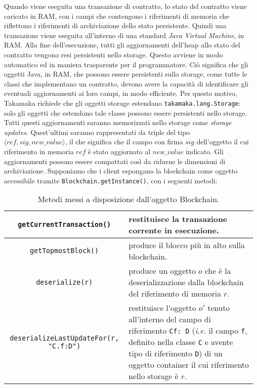 Quando viene eseguita una transazione di contratto, lo stato del contratto viene caricato in RAM, con i campi che contengono i riferimenti di memoria che riflettono i riferimenti di archiviazione dello stato persistente. Quindi una transazione viene eseguita all'interno di una standard \textit{Java Virtual Machine}, in RAM. Alla fine dell'esecuzione, tutti gli aggiornamenti dell'heap allo stato del contratto vengono resi persistenti nello storage. Questo avviene in modo automatico ed in maniera trasparente per il programmatore. Ciò significa che gli oggetti Java, in RAM, che possono essere persistenti sullo storage, come tutte le classi che implementano un contratto, devono avere la capacità di identificare gli eventuali aggiornamenti ai loro campi, in modo efficiente. Per questo motivo, Takamaka richiede che gli oggetti storage estendano \lstinline|takamaka.lang.Storage|: solo gli oggetti che estendono tale classe possono essere persistenti nello storage. Tutti questi aggiornamenti saranno memorizzati nello storage come \textit{storage updates}. Quest'ultimi saranno rappresentati da triple del tipo $\langle ref, sig, new\_value \rangle$, il che significa che il campo con firma $sig$ dell'oggetto il cui riferimento in memoria $ref$ è stato aggiornato al $new\_value$ indicato. Gli aggiornamenti possono essere compattati così da ridurne le dimensioni di archiviazione.
Supponiamo che i client espongano la blockchain come oggetto accessibile tramite \lstinline|Blockchain.getInstance()|, con i seguenti metodi:

%
\begin{table}[h]
	\centering
	\begin{tabular}{|c|p{6cm}|}
		\hline
		\lstinline|getCurrentTransaction()| & restituisce la transazione corrente in esecuzione.\\ \hline
		\lstinline|getTopmostBlock()| & produce il blocco più in alto sulla blockchain.\\ \hline
		\lstinline|deserialize(r)| & produce un oggetto $o$ che è la deserializzazione dalla blockchain del riferimento di memoria $r$.\\ \hline
		\lstinline|deserializeLastUpdateFor(r, "C.f:D")| & restituisce l'oggetto $o'$ tenuto all'interno del campo di riferimento \lstinline|Cf: D| (\textit{i.e.} il campo \lstinline|f|, definito nella classe \lstinline|C| e avente tipo di riferimento \lstinline|D|) di un oggetto container il cui riferimento nello storage è $r$.\\ \hline
	\end{tabular}
	\caption{Metodi messi a disposizione dall'oggetto Blockchain.}
	\label{tab:metodi-oggetto-blockchain}
\end{table}
%

